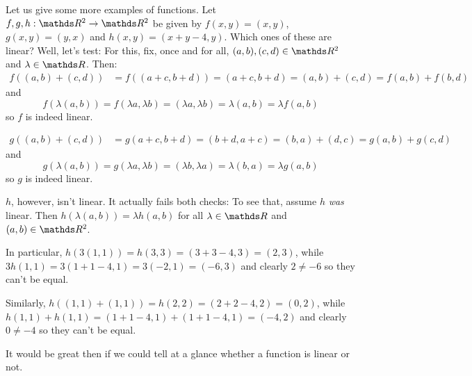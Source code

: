 \begin{ex}
	Let us give some more examples of functions. Let $f,g,h:\R^2\to\R^2$ be given by $f(x,y)=(x,y)$, $g(x,y)=(y,x)$ and $h(x,y)=(x+y-4,y)$. Which ones of these are linear? Well, let's test: For this, fix, once and for all, $(a,b),(c,d)\in \R^2$ and $\lambda\in \R$. Then:
	\begin{align*}
		f((a,b)+(c,d))&=f((a+c,b+d))=(a+c,b+d)=(a,b)+(c,d)=f(a,b)+f(b,d)
	\end{align*}and
	\[f(\lambda (a,b))=f(\lambda a,\lambda b)=(\lambda a, \lambda b)=\lambda (a,b)=\lambda f(a,b)\]so $f$ is indeed linear.
	
	\begin{align*}
		g((a,b)+(c,d))&=g(a+c,b+d)=(b+d,a+c)=(b,a)+(d,c)=g(a,b)+g(c,d)
	\end{align*}and
	\[g(\lambda (a,b))=g(\lambda a,\lambda b)=(\lambda b,\lambda a)=\lambda (b,a)=\lambda g(a,b)\]so $g$ is indeed linear.
	
	$h$, however, isn't linear. It actually fails both checks: To see that, assume $h$ \textit{was} linear. Then $h(\lambda (a,b))=\lambda h(a,b)$ for all $\lambda \in \R$ and $(a,b)\in \R^2$.
	
	In particular, $h(3(1,1))=h(3,3)=(3+3-4,3)=(2,3)$, while $3h(1,1)=3(1+1-4,1)=3(-2,1)=(-6,3)$ and clearly $2\neq -6$ so they can't be equal.
	
	Similarly, $h((1,1)+(1,1))=h(2,2)=(2+2-4,2)=(0,2)$, while $h(1,1)+h(1,1)=(1+1-4,1)+(1+1-4,1)=(-4,2)$ and clearly $0\neq -4$ so they can't be equal.
	
	\bigskip
	It would be great then if we could tell at a glance whether a function is linear or not.
\end{ex}

